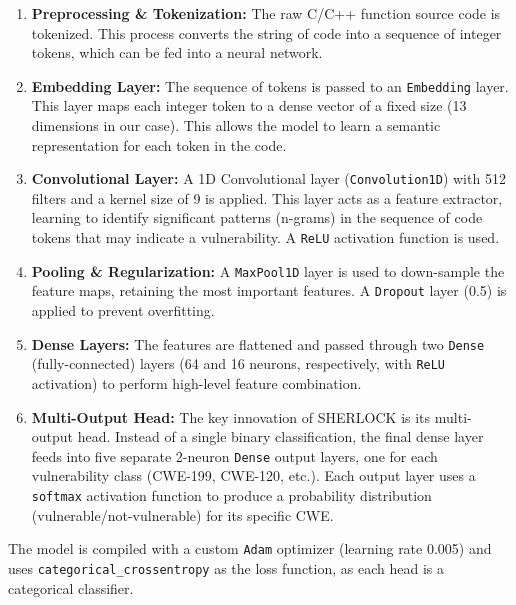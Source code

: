 \documentclass[conference]{IEEEtran}
\begin{document}
\begin{enumerate}
    \item \textbf{Preprocessing \& Tokenization:} The raw C/C++ function source code is tokenized. This process converts the string of code into a sequence of integer tokens, which can be fed into a neural network.

    \item \textbf{Embedding Layer:} The sequence of tokens is passed to an \texttt{Embedding} layer. This layer maps each integer token to a dense vector of a fixed size (13 dimensions in our case). This allows the model to learn a semantic representation for each token in the code.

    \item \textbf{Convolutional Layer:} A 1D Convolutional layer (\texttt{Convolution1D}) with 512 filters and a kernel size of 9 is applied. This layer acts as a feature extractor, learning to identify significant patterns (n-grams) in the sequence of code tokens that may indicate a vulnerability. A \texttt{ReLU} activation function is used.

    \item \textbf{Pooling \& Regularization:} A \texttt{MaxPool1D} layer is used to down-sample the feature maps, retaining the most important features. A \texttt{Dropout} layer (0.5) is applied to prevent overfitting.

    \item \textbf{Dense Layers:} The features are flattened and passed through two \texttt{Dense} (fully-connected) layers (64 and 16 neurons, respectively, with \texttt{ReLU} activation) to perform high-level feature combination.

    \item \textbf{Multi-Output Head:} The key innovation of SHERLOCK is its multi-output head. Instead of a single binary classification, the final dense layer feeds into five separate 2-neuron \texttt{Dense} output layers, one for each vulnerability class (CWE-199, CWE-120, etc.). Each output layer uses a \texttt{softmax} activation function to produce a probability distribution (vulnerable/not-vulnerable) for its specific CWE.
\end{enumerate}

The model is compiled with a custom \texttt{Adam} optimizer (learning rate 0.005) and uses \texttt{categorical\_crossentropy} as the loss function, as each head is a categorical classifier.
\end{document}

